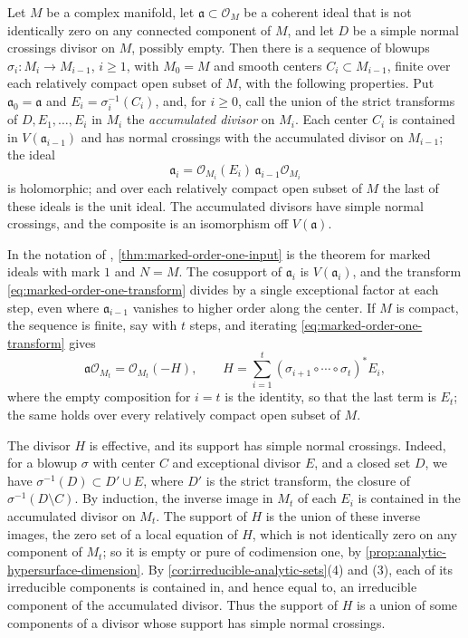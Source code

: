 \begin{theorem}[Principalization]\label{thm:marked-order-one-input}
Let $M$ be a complex manifold, let $\mathfrak a\subset\mathcal O_M$ be a coherent ideal that is not identically zero on any connected component of $M$, and let $D$ be a simple normal crossings divisor on $M$, possibly empty. Then there is a sequence of blowups $\sigma_i\colon M_i\to M_{i-1}$, $i\geq1$, with $M_0=M$ and smooth centers $C_i\subset M_{i-1}$, finite over each relatively compact open subset of $M$, with the following properties. Put $\mathfrak a_0=\mathfrak a$ and $E_i=\sigma_i^{-1}(C_i)$, and, for $i\geq0$, call the union of the strict transforms of $D,E_1,\ldots,E_i$ in $M_i$ the \emph{accumulated divisor} on $M_i$. Each center $C_i$ is contained in $V(\mathfrak a_{i-1})$ and has normal crossings with the accumulated divisor on $M_{i-1}$; the ideal
\begin{equation}\label{eq:marked-order-one-transform}
 \mathfrak a_i=\mathcal O_{M_i}(E_i)\,
                   \mathfrak a_{i-1}\mathcal O_{M_i}
\end{equation}
is holomorphic; and over each relatively compact open subset of $M$ the last of these ideals is the unit ideal. The accumulated divisors have simple normal crossings, and the composite is an isomorphism off $V(\mathfrak a)$.
\end{theorem}

In the notation of \cite{BM08}, \cref{thm:marked-order-one-input} is the theorem for marked ideals with mark $1$ and $N=M$. The cosupport of $\mathfrak a_i$ is $V(\mathfrak a_i)$, and the transform \eqref{eq:marked-order-one-transform} divides by a single exceptional factor at each step, even where $\mathfrak a_{i-1}$ vanishes to higher order along the center. If $M$ is compact, the sequence is finite, say with $t$ steps, and iterating \eqref{eq:marked-order-one-transform} gives
\[
 \mathfrak a\mathcal O_{M_t}=\mathcal O_{M_t}(-H),
 \qquad H=\sum_{i=1}^t(\sigma_{i+1}\circ\cdots\circ\sigma_t)^*E_i,
\]
where the empty composition for $i=t$ is the identity, so that the last term is $E_t$; the same holds over every relatively compact open subset of $M$.

The divisor $H$ is effective, and its support has simple normal crossings. Indeed, for a blowup $\sigma$ with center $C$ and exceptional divisor $E$, and a closed set $D$, we have $\sigma^{-1}(D)\subset D'\cup E$, where $D'$ is the strict transform, the closure of $\sigma^{-1}(D\setminus C)$. By induction, the inverse image in $M_t$ of each $E_i$ is contained in the accumulated divisor on $M_t$. The support of $H$ is the union of these inverse images, the zero set of a local equation of $H$, which is not identically zero on any component of $M_t$; so it is empty or pure of codimension one, by \cref{prop:analytic-hypersurface-dimension}. By \cref{cor:irreducible-analytic-sets}(4) and (3), each of its irreducible components is contained in, and hence equal to, an irreducible component of the accumulated divisor. Thus the support of $H$ is a union of some components of a divisor whose support has simple normal crossings.

